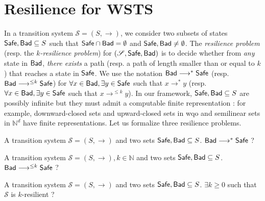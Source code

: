 
\section{Resilience for WSTS}


In a transition system $\mathscr{S}=(S,\rightarrow)$, we consider two subsets of states $\textsf{Safe}, \textsf{Bad} \subseteq S$ such that $\textsf{Safe} \cap  \textsf{Bad} = \emptyset$ and $\textsf{Safe} ,  \textsf{Bad} \neq \emptyset$.
The \emph{resilience problem} (resp. the \emph{$k$-resilience problem}) for $(\mathscr{S},\textsf{Safe},\textsf{Bad})$ is to decide whether from \emph{any} state in $\textsf{Bad}$, \emph{there exists} a path (resp. a path of length smaller than or equal to $k$) that reaches a state in $\textsf{Safe}$. We use the notation $\textsf{Bad} \longrightarrow^{*} \textsf{Safe}$ (resp. $\textsf{Bad} \longrightarrow^{\leq k} \textsf{Safe}$) for $\forall x \in \textsf{Bad}, \exists y \in \textsf{Safe}$ such that $x \longrightarrow^{*} y$ (resp.  $\forall x \in \textsf{Bad}, \exists y \in \textsf{Safe}$ such that $x \longrightarrow^{\leq k} y$). In our framework, $\textsf{Safe}, \textsf{Bad} \subseteq S$  are possibly infinite but they must admit a computable finite representation : for example, downward-closed sets and upward-closed sets in wqo and semilinear sets in $\mathbb{N}^d$ have finite representations. 
Let us formalize three resilience problems.


{A transition system $\mathscr{S}=(S,\rightarrow)$ and two sets $\textsf{Safe}, \textsf{Bad} \subseteq S$.}
{$\textsf{Bad} \longrightarrow^{*} \textsf{Safe}$ ?\newline}
%

%

{A transition system $\mathscr{S}=(S,\rightarrow), k \in \mathbb{N}$ and two sets $\textsf{Safe}, \textsf{Bad} \subseteq S$.}
{$\textsf{Bad} \longrightarrow^{\leq k} \textsf{Safe}$ ?\newline}

{A transition system $\mathscr{S}=(S,\rightarrow)$ and two sets $\textsf{Safe}, \textsf{Bad} \subseteq S$.}
{$\exists k \geq 0$ such that $\mathscr{S}$ is %
 $k$-resilient ?\newline}


